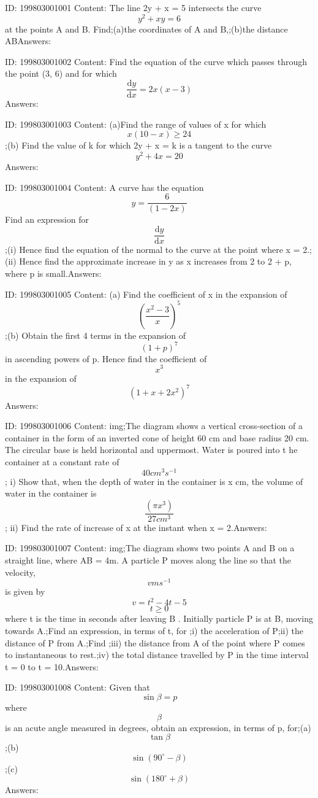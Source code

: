 \documentclass{article}
\begin{document}
ID: 199803001001
Content:
The line 2y + x = 5 intersects the curve \[y^2+xy=6\] at the points A and B. Find;(a)the coordinates of A and B,;(b)the distance ABAnswers:

ID: 199803001002
Content:
Find the equation of the curve which passes through the point (3, 6) and for which \[\frac{\mathrm{d} y}{\mathrm{d} x}=2x(x-3)\]Answers:

ID: 199803001003
Content:
(a)Find the range of values of x for which \[x(10-x)\geq 24\];(b) Find the value of k for which 2y + x = k is a tangent to the curve \[y^2+4x=20\]Answers:

ID: 199803001004
Content:
A curve has the equation \[y=\frac{6}{(1-2x)}\] Find an expression for \[\frac{\mathrm{d} y}{\mathrm{d} x}\] ;(i) Hence find the equation of the normal to the curve at the point where x = 2.;(ii) Hence find the approximate increase in y as x increases from 2 to 2 + p, where p is small.Answers:

ID: 199803001005
Content:
(a) Find the coefficient of x in the expansion of \[(\frac{x^2-3}{x})^5\];(b) Obtain the first 4 terms in the expansion of \[(1+p)^7\] in ascending powers of p. Hence find the coefficient of \[x^3\] in the expansion of \[(1+x+2x^2)^7\]Answers:

ID: 199803001006
Content:
img;The diagram shows a vertical cross-section of a container in the form of an inverted cone of height 60 cm and base radius 20 cm. The circular base is held horizontal and uppermost. Water is poured into t he container at a constant rate of \[40cm^3s^{-1}\]; i) Show that, when the depth of water in the container is x cm, the volume of water in the container is \[\frac{(\pi x^3)}{27cm^3}\]; ii) Find the rate of increase of x at the instant when x = 2.Answers:

ID: 199803001007
Content:
img;The diagram shows two points A and B on a straight line, where AB = 4m. A particle P moves along the line so that the velocity, \[vms^{-1}\] is given by \[v=t^2-4t-5 \] \[t\geq 0\] where t is the time in seconds after leaving B . Initially particle P is at B, moving towards A.;Find an expression, in terms of t, for ;i) the acceleration of P;ii) the distance of P from A.;Find ;iii) the distance from A of the point where P comes to instantaneous to rest.;iv) the total distance travelled by P in the time interval t = 0 to t = 10.Answers:

ID: 199803001008
Content:
Given that \[\sin\beta=p\] where \[\beta\] is an acute angle measured in degrees, obtain an expression, in terms of p, for;(a) \[\tan\beta\];(b) \[\sin(90^{\circ}-\beta)\];(c) \[\sin(180^{\circ}+\beta)\]Answers:
\end{document}
